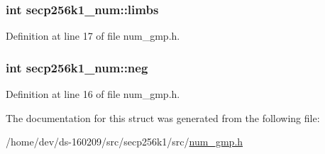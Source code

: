\subsubsection[{limbs}]{\setlength{\rightskip}{0pt plus 5cm}int secp256k1\+\_\+num\+::limbs}\label{structsecp256k1__num_ab283e099d0543cb7e222a9e74a39aa94}


Definition at line 17 of file num\+\_\+gmp.\+h.

\hypertarget{structsecp256k1__num_a5d762d76e2a0fe84313ed5e41397b10b}{}
\subsubsection[{neg}]{\setlength{\rightskip}{0pt plus 5cm}int secp256k1\+\_\+num\+::neg}\label{structsecp256k1__num_a5d762d76e2a0fe84313ed5e41397b10b}


Definition at line 16 of file num\+\_\+gmp.\+h.



The documentation for this struct was generated from the following file\+:\begin{DoxyCompactItemize}
\item 
/home/dev/ds-\/160209/src/secp256k1/src/\hyperlink{num__gmp_8h}{num\+\_\+gmp.\+h}\end{DoxyCompactItemize}
